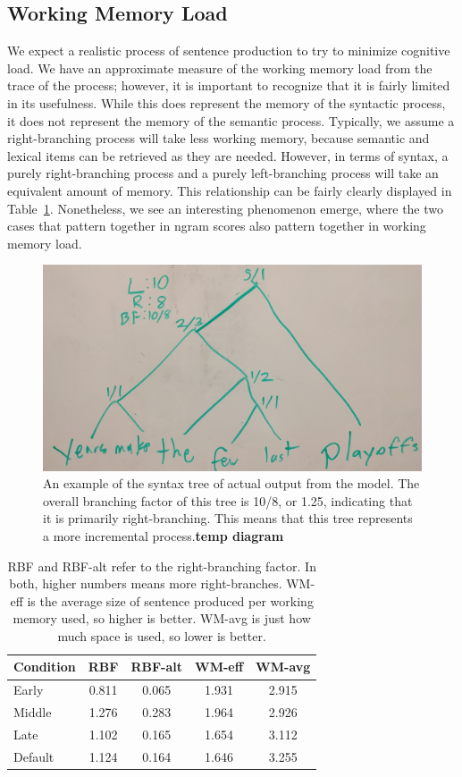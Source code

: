 \subsection{Working Memory Load}
We expect a realistic process of sentence production to try to minimize cognitive load. We have an approximate measure of the working memory load from the trace of the process; however, it is important to recognize that it is fairly limited in its usefulness. While this does represent the memory of the syntactic process, it does not represent the memory of the semantic process. Typically, we assume a right-branching process will take less working memory, because semantic and lexical items can be retrieved as they are needed. However, in terms of syntax, a purely right-branching process and a purely left-branching process will take an equivalent amount of memory. This relationship can be fairly clearly displayed in Table~\ref{bfmem}. Nonetheless, we see an interesting phenomenon emerge, where the two cases that pattern together in ngram scores also pattern together in working memory load.

\begin{figure}[ht]
\begin{center}
\includegraphics[width=0.95\columnwidth]{figures/tree}
\end{center}
\caption{An example of the syntax tree of actual output from the model. The overall branching factor of this tree is 10/8, or 1.25, indicating that it is primarily right-branching. This means that this tree represents a more incremental process.\textbf{temp diagram}}  
\label{tree}
\end{figure}

\begin{table}
\centering
\begin{tabular}{l|cccc}
Condition & RBF & RBF-alt & WM-eff & WM-avg \\ \hline
Early & 0.811 & 0.065 & 1.931 & 2.915 \\
Middle & 1.276 & 0.283 & 1.964 & 2.926 \\
Late & 1.102 & 0.165 & 1.654 & 3.112 \\
Default & 1.124 & 0.164 & 1.646 & 3.255 \\
\end{tabular}
\label{bfmem}
\caption{RBF and RBF-alt refer to the right-branching factor. In both, higher numbers means more right-branches. WM-eff is the average size of sentence produced per working memory used, so higher is better. WM-avg is just how much space is used, so lower is better.}
\end{table}

